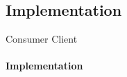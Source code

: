 \subsection{Implementation}

\begin{frame}{Consumer Client}
    \framesubtitle{Implementation}
\end{frame}
